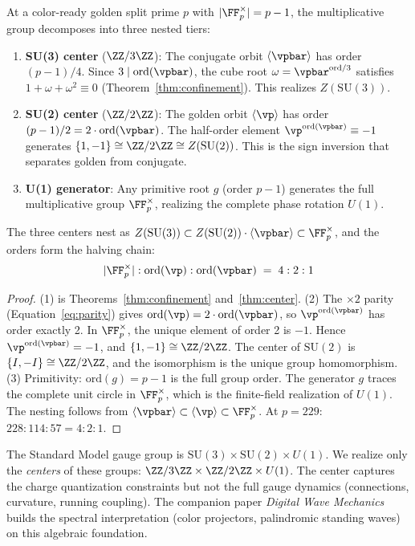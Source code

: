 \begin{theorem}\label{thm:gauge}
At a color-ready golden split prime $p$ with $|{\FF_p^\times}| = p - 1$, the multiplicative group decomposes into three nested tiers:
\begin{enumerate}
\item \textbf{SU(3) center} ($\ZZ/3\ZZ$): The conjugate orbit $\langle\vpbar\rangle$ has order $(p-1)/4$. Since $3 \mid \mathrm{ord}(\vpbar)$, the cube root $\omega = \vpbar^{\mathrm{ord}/3}$ satisfies $1 + \omega + \omega^2 \equiv 0$ (Theorem~\ref{thm:confinement}). This realizes $Z(\mathrm{SU}(3))$.
\item \textbf{SU(2) center} ($\ZZ/2\ZZ$): The golden orbit $\langle\vp\rangle$ has order $(p-1)/2 = 2 \cdot \mathrm{ord}(\vpbar)$. The half-order element $\vp^{\mathrm{ord}(\vpbar)} \equiv -1$ generates $\{1, -1\} \cong \ZZ/2\ZZ \cong Z(\mathrm{SU}(2))$. This is the sign inversion that separates golden from conjugate.
\item \textbf{U(1) generator}: Any primitive root $g$ (order $p - 1$) generates the full multiplicative group $\FF_p^\times$, realizing the complete phase rotation $U(1)$.
\end{enumerate}
The three centers nest as $Z(\mathrm{SU}(3)) \subset Z(\mathrm{SU}(2)) \cdot \langle\vpbar\rangle \subset \FF_p^\times$, and the orders form the halving chain:
$$|{\FF_p^\times}| : \mathrm{ord}(\vp) : \mathrm{ord}(\vpbar) \;=\; 4 : 2 : 1$$
\end{theorem}

\begin{proof}
(1) is Theorems~\ref{thm:confinement} and~\ref{thm:center}. (2) The $\times 2$ parity (Equation~\ref{eq:parity}) gives $\mathrm{ord}(\vp) = 2 \cdot \mathrm{ord}(\vpbar)$, so $\vp^{\mathrm{ord}(\vpbar)}$ has order exactly 2. In $\FF_p^\times$, the unique element of order 2 is $-1$. Hence $\vp^{\mathrm{ord}(\vpbar)} = -1$, and $\{1, -1\} \cong \ZZ/2\ZZ$. The center of $\mathrm{SU}(2)$ is $\{I, -I\} \cong \ZZ/2\ZZ$, and the isomorphism is the unique group homomorphism. (3) Primitivity: $\mathrm{ord}(g) = p - 1$ is the full group order. The generator $g$ traces the complete unit circle in $\FF_p^\times$, which is the finite-field realization of $U(1)$. The nesting follows from $\langle\vpbar\rangle \subset \langle\vp\rangle \subset \FF_p^\times$. At $p = 229$: $228 : 114 : 57 = 4 : 2 : 1$. \qedhere
\end{proof}

\begin{remark}
The Standard Model gauge group is $\mathrm{SU}(3) \times \mathrm{SU}(2) \times U(1)$. We realize only the \emph{centers} of these groups: $\ZZ/3\ZZ \times \ZZ/2\ZZ \times U(1)$. The center captures the charge quantization constraints but not the full gauge dynamics (connections, curvature, running coupling). The companion paper \emph{Digital Wave Mechanics} builds the spectral interpretation (color projectors, palindromic standing waves) on this algebraic foundation.
\end{remark}

